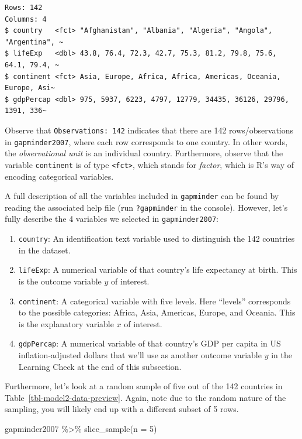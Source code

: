 \documentclass[
  letterpaper,
  DIV=11,
  numbers=noendperiod]{scrreprt}
\newenvironment{Shaded}{\begin{snugshade}}{\end{snugshade}}
\newcommand{\AttributeTok}[1]{\textcolor[rgb]{0.40,0.45,0.13}{#1}}
\newcommand{\DecValTok}[1]{\textcolor[rgb]{0.68,0.00,0.00}{#1}}
\newcommand{\FunctionTok}[1]{\textcolor[rgb]{0.28,0.35,0.67}{#1}}
\newcommand{\NormalTok}[1]{\textcolor[rgb]{0.00,0.23,0.31}{#1}}
\newcommand{\SpecialCharTok}[1]{\textcolor[rgb]{0.37,0.37,0.37}{#1}}
\theoremstyle{definition}
\theoremstyle{remark}
\begin{document}
\begin{verbatim}
Rows: 142
Columns: 4
$ country   <fct> "Afghanistan", "Albania", "Algeria", "Angola", "Argentina", ~
$ lifeExp   <dbl> 43.8, 76.4, 72.3, 42.7, 75.3, 81.2, 79.8, 75.6, 64.1, 79.4, ~
$ continent <fct> Asia, Europe, Africa, Africa, Americas, Oceania, Europe, Asi~
$ gdpPercap <dbl> 975, 5937, 6223, 4797, 12779, 34435, 36126, 29796, 1391, 336~
\end{verbatim}

Observe that \texttt{Observations:\ 142} indicates that there are 142
rows/observations in \texttt{gapminder2007}, where each row corresponds
to one country. In other words, the \emph{observational unit} is an
individual country. Furthermore, observe that the variable
\texttt{continent} is of type \texttt{\textless{}fct\textgreater{}},
which stands for \emph{factor}, which is R's way of encoding categorical
variables.

A full description of all the variables included in \texttt{gapminder}
can be found by reading the associated help file (run
\texttt{?gapminder} in the console). However, let's fully describe the 4
variables we selected in \texttt{gapminder2007}:

\begin{enumerate}
\def\labelenumi{\arabic{enumi}.}
\item
  \texttt{country}: An identification text variable used to distinguish
  the 142 countries in the dataset.
\item
  \texttt{lifeExp}: A numerical variable of that country's life
  expectancy at birth. This is the outcome variable \(y\) of interest.
\item
  \texttt{continent}: A categorical variable with five levels. Here
  ``levels'' corresponds to the possible categories: Africa, Asia,
  Americas, Europe, and Oceania. This is the explanatory variable \(x\)
  of interest.
\item
  \texttt{gdpPercap}: A numerical variable of that country's GDP per
  capita in US inflation-adjusted dollars that we'll use as another
  outcome variable \(y\) in the Learning Check at the end of this
  subsection.
\end{enumerate}

Furthermore, let's look at a random sample of five out of the 142
countries in Table~\ref{tbl-model2-data-preview}. Again, note due to the
random nature of the sampling, you will likely end up with a different
subset of 5 rows.

\begin{Shaded}
\begin{Highlighting}[]
\NormalTok{gapminder2007 }\SpecialCharTok{\%\textgreater{}\%}
  \FunctionTok{slice\_sample}\NormalTok{(}\AttributeTok{n =} \DecValTok{5}\NormalTok{)}
\end{Highlighting}
\end{Shaded}
\end{document}

